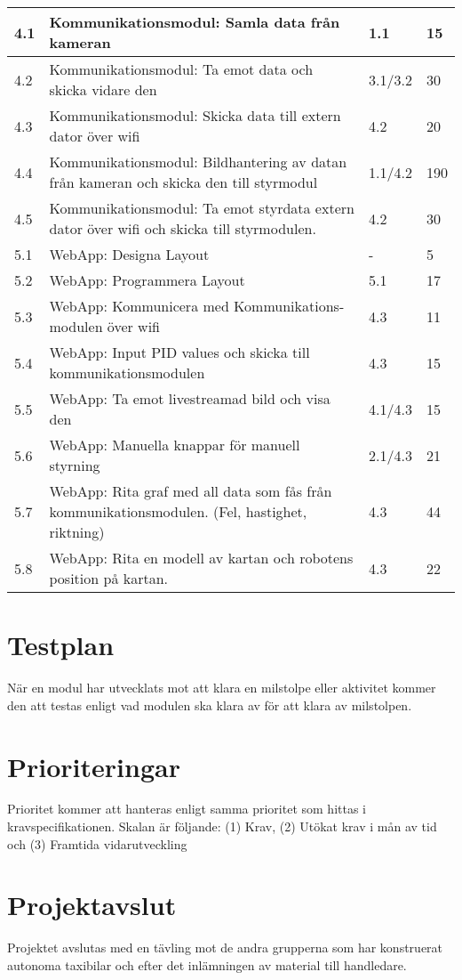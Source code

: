 \documentclass[10pt,oneside,swedish]{lips}
\begin{document}
\begin{longtable}{|l|p{80mm}|p{20mm}|l|}
    4.1 & Kommunikationsmodul: Samla data från kameran & 1.1 & 15 \\
    \hline      
    4.2 & Kommunikationsmodul: Ta emot data och skicka vidare den & 3.1/3.2 & 30 \\
    \hline      
    4.3 & Kommunikationsmodul: Skicka data till extern dator över wifi  & 4.2 & 20 \\
    \hline      
    4.4 & Kommunikationsmodul: Bildhantering av datan från kameran och skicka den till styrmodul & 1.1/4.2 & 190 \\
    \hline      
    4.5 & Kommunikationsmodul: Ta emot styrdata extern dator över wifi och skicka till styrmodulen. & 4.2 & 30 \\
    \hline
    \hline
   
    5.1 & WebApp: Designa Layout & - & 5 \\
    \hline
    5.2 & WebApp: Programmera Layout & 5.1 & 17 \\
    \hline
    5.3 & WebApp: Kommunicera med Kommunikations-modulen över wifi & 4.3 & 11 \\
    \hline
    5.4 & WebApp: Input PID values och skicka till kommunikationsmodulen & 4.3 & 15 \\
    \hline
    5.5 & WebApp: Ta emot livestreamad bild och visa den & 4.1/4.3 & 15 \\
    \hline
    5.6 & WebApp: Manuella knappar för manuell styrning & 2.1/4.3 & 21 \\
    \hline
    5.7 & WebApp: Rita graf med all data som fås från kommunikationsmodulen. (Fel, hastighet, riktning)& 4.3 & 44 \\
    \hline
    5.8 & WebApp: Rita en modell av kartan och robotens position på kartan. & 4.3 & 22 \\
    \hline
\end{longtable}
\clearpage



\section{Testplan}
När en modul har utvecklats mot att klara en milstolpe eller aktivitet kommer den att testas enligt vad modulen ska klara av för att klara av milstolpen.

\section{Prioriteringar}
Prioritet kommer att hanteras enligt samma prioritet som hittas i kravspecifikationen\cite{kravspec}.
Skalan är följande: (1) Krav, (2) Utökat krav i mån av tid och (3) Framtida vidarutveckling

\section{Projektavslut}
Projektet avslutas med en tävling mot de andra grupperna som har konstruerat autonoma taxibilar och efter det inlämningen av material till handledare.

\clearpage

\end{document}
